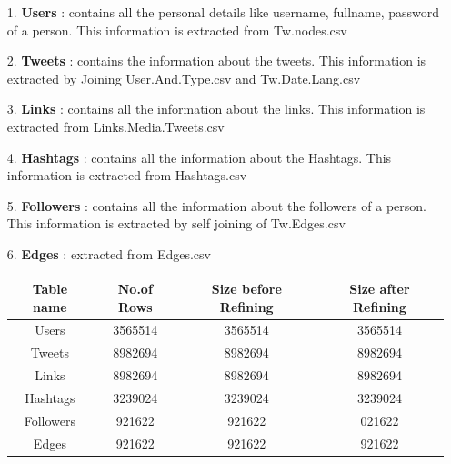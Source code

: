 \documentclass{uofa-eng-assignment}
\begin{document}
\begin{enumerate}
    \item[1.] \textbf{Users} : contains all the personal details like username, fullname, password of a person. This information is extracted from Tw.nodes.csv 
    \item[2.] \textbf{Tweets} : contains the information about the tweets. This information is extracted by Joining User.And.Type.csv and Tw.Date.Lang.csv 

    \item[3.] \textbf{Links} : contains all the information about the links. This information is extracted from Links.Media.Tweets.csv

    \item[4.] \textbf{Hashtags} : contains all the information about the Hashtags. This information is extracted from Hashtags.csv

    \item[5.] \textbf{Followers} : contains all the information about the followers of a person. This information is extracted by self joining of Tw.Edges.csv 

    \item[6.] \textbf{Edges} : extracted from Edges.csv 

    \begin{center}
    \begin{tabular}{|c | c| c |  c|}
        \hline 
        Table name & No.of Rows & Size before Refining & Size after Refining \\
        \hline 
        Users & 3565514 & 3565514 & 3565514 \\
        Tweets & 8982694 & 8982694 & 8982694 \\
        Links & 8982694 & 8982694 & 8982694 \\
        Hashtags & 3239024 & 3239024 & 3239024 \\
        Followers & 921622 & 921622 & 021622 \\
        Edges & 921622 & 921622 & 921622 \\
        \hline  
    \end{tabular}
    \end{center}

\end{enumerate}
\end{document}
